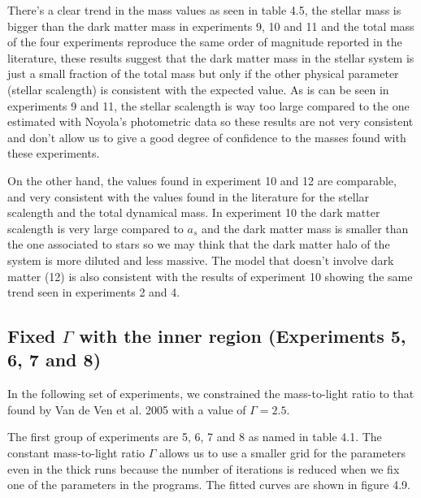 There's a clear trend in the mass values as seen in table 4.5, the stellar mass is bigger than the dark matter mass in experiments 9, 10 and 11 and the total mass of the four experiments reproduce the same order of magnitude reported in the literature, these results suggest that the dark matter mass in the stellar system is just a small fraction of the total mass but only if the other physical parameter (stellar scalength) is consistent with the expected value. As is can be seen in experiments 9 and 11, the stellar scalength is way too large compared to the one estimated with Noyola's photometric data so these results are not very consistent and don't allow us to give a good degree of confidence to the masses found with these experiments. 

On the other hand, the values found in experiment 10 and 12 are comparable, and very consistent with the values found in the literature for the stellar scalength and the total dynamical mass. In experiment 10 the dark matter scalength is very large compared to $a_s$ and the dark matter mass is smaller than the one associated to stars so we may think that the dark matter halo of the system is more diluted and less massive. The model that doesn't involve dark matter (12) is also consistent with the results of experiment 10 showing the same trend seen in experiments 2 and 4.  

\subsection{Fixed $\Gamma$ with the inner region (Experiments 5, 6, 7 and 8)}

In the following set of experiments, we constrained the mass-to-light ratio to that found by Van de Ven et al. 2005 with a value of $\Gamma = 2.5$. 

The first group of experiments are 5, 6, 7 and 8 as named in table 4.1. The constant mass-to-light ratio $\Gamma$ allows us to use a smaller grid for the parameters even in the thick runs because the number of iterations is reduced when we fix one of the parameters in the programs. The fitted curves are shown in figure 4.9. 

